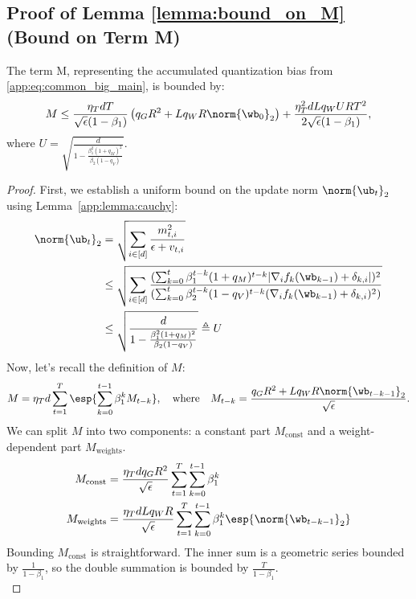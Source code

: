 \documentclass[11pt, letterpaper]{article}
\begin{document}
\subsection{Proof of Lemma \ref{lemma:bound_on_M} (Bound on Term M)}
\begin{lemma}
\label{lemma:bound_on_M}
The term M, representing the accumulated quantization bias from \eqref{app:eq:common_big_main}, is bounded by:
\begin{align}
    M \le \frac{\eta_T d T}{\sqrt{\epsilon}(1-\beta_1)} \left( q_G R^2 + L q_W R \norm{\wb_0}_2 \right) + \frac{\eta_T^2 d L q_W UR T^2}{2\sqrt{\epsilon}(1-\beta_1)},
\end{align}
where $U = \sqrt{\frac{d}{1-\frac{\beta_1^2(1+q_M)^2}{\beta_2(1-q_V)}}}$.
\end{lemma}
\begin{proof}
First, we establish a uniform bound on the update norm $\norm{\ub_t}_2$ using Lemma~\ref{app:lemma:cauchy}:
\begin{align}
    \norm{\ub_t}_2 &= \sqrt{\sum_{i\in [d]}\frac{m_{t,i}^2}{\epsilon+v_{t,i}}} \nonumber \\
    & \le \sqrt{\sum_{i\in [d]}\frac{(\sum_{k=0}^t\beta_1^{t-k}(1+q_M)^{t-k}|\nabla_i f_k(\wb_{k-1}) + \delta_{k,i}|)^2}{(\sum_{k=0}^t\beta_2^{t-k}(1-q_V)^{t-k}(\nabla_i f_k(\wb_{k-1}) + \delta_{k,i})^2)}} \nonumber \\
    & \le \sqrt{\frac{d}{1-\frac{\beta_1^2(1+q_M)^2}{\beta_2(1-q_V)}}} \triangleq U
\end{align}
Now, let's recall the definition of $M$:
\begin{equation*}
    M = \eta_T d \sum_{t=1}^T \esp{\sum_{k=0}^{t-1} \beta_1^k M_{t-k}}, \quad \text{where} \quad M_{t-k} = \frac{q_G R^2 + L q_W R \norm{\wb_{t-k-1}}_2}{\sqrt{\epsilon}}.
\end{equation*}
We can split $M$ into two components: a constant part $M_{\text{const}}$ and a weight-dependent part $M_{\text{weights}}$.
\begin{align*}
    M_{\text{const}} &= \frac{\eta_T d q_G R^2}{\sqrt{\epsilon}} \sum_{t=1}^T \sum_{k=0}^{t-1} \beta_1^k \\
    M_{\text{weights}} &= \frac{\eta_T d L q_W R}{\sqrt{\epsilon}} \sum_{t=1}^T \sum_{k=0}^{t-1} \beta_1^k \esp{\norm{\wb_{t-k-1}}_2}
\end{align*}
Bounding $M_{\text{const}}$ is straightforward. The inner sum is a geometric series bounded by $\frac{1}{1-\beta_1}$, so the double summation is bounded by $\frac{T}{1-\beta_1}$.
\begin{equation}

\end{equation}
\end{proof}
\end{document}
